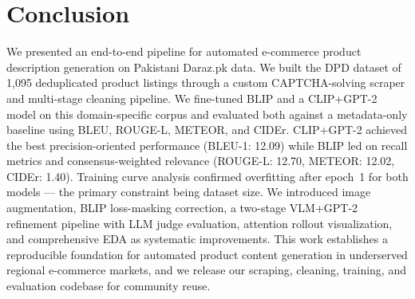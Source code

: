 \documentclass[12pt,a4paper]{article}
\begin{document}
\section{Conclusion}

We presented an end-to-end pipeline for automated e-commerce product description
generation on Pakistani Daraz.pk data. We built the DPD dataset of 1,095 deduplicated
product listings through a custom CAPTCHA-solving scraper and multi-stage cleaning
pipeline. We fine-tuned BLIP and a CLIP+GPT-2 model on this domain-specific corpus
and evaluated both against a metadata-only baseline using BLEU, ROUGE-L, METEOR, and
CIDEr. CLIP+GPT-2 achieved the best precision-oriented performance (BLEU-1: 12.09)
while BLIP led on recall metrics and consensus-weighted relevance (ROUGE-L: 12.70,
METEOR: 12.02, CIDEr: 1.40). Training curve analysis confirmed overfitting after
epoch~1 for both models --- the primary constraint being dataset size. We introduced
image augmentation, BLIP loss-masking correction, a two-stage VLM+GPT-2 refinement
pipeline with LLM judge evaluation, attention rollout visualization, and comprehensive
EDA as systematic improvements. This work establishes a reproducible foundation for
automated product content generation in underserved regional e-commerce markets, and
we release our scraping, cleaning, training, and evaluation codebase for community reuse.
\end{document}
